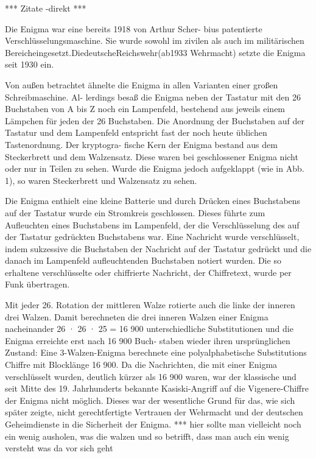 *** Zitate -direkt ***

Die Enigma war eine bereits 1918 von Arthur Scher- bius patentierte Verschlüsselungsmaschine. Sie wurde sowohl im zivilen als auch im militärischen Bereicheingesetzt.DiedeutscheReichswehr(ab1933 Wehrmacht) setzte die Enigma seit 1930 ein.

Von außen betrachtet ähnelte die Enigma in allen Varianten einer großen Schreibmaschine. Al- lerdings besaß die Enigma neben der Tastatur mit den 26 Buchstaben von A bis Z noch ein Lampenfeld, bestehend aus jeweils einem Lämpchen für jeden der 26 Buchstaben. Die Anordnung der Buchstaben auf der Tastatur und dem Lampenfeld entspricht fast der noch heute üblichen Tastenordnung. Der kryptogra- fische Kern der Enigma bestand aus dem Steckerbrett und dem Walzensatz. Diese waren bei geschlossener Enigma nicht oder nur in Teilen zu sehen. Wurde die Enigma jedoch aufgeklappt (wie in Abb. 1), so waren Steckerbrett und Walzensatz zu sehen.

Die Enigma enthielt eine kleine Batterie und durch Drücken eines Buchstabens auf der Tastatur wurde ein Stromkreis geschlossen. Dieses führte zum Aufleuchten eines Buchstabens im Lampenfeld, der die Verschlüsselung des auf der Tastatur gedrückten Buchstabens war. Eine Nachricht wurde verschlüsselt, indem sukzessive die Buchstaben der Nachricht auf der Tastatur gedrückt und die danach im Lampenfeld aufleuchtenden Buchstaben notiert wurden. Die so erhaltene verschlüsselte oder chiffrierte Nachricht, der Chiffretext, wurde per Funk übertragen.

Mit jeder 26. Rotation der mittleren Walze rotierte auch die linke der inneren drei Walzen. Damit berechneten die drei inneren Walzen einer Enigma nacheinander 26 · 26 · 25 = 16 900 unterschiedliche Substitutionen und die Enigma erreichte erst nach 16 900 Buch- staben wieder ihren ursprünglichen Zustand: Eine 3-Walzen-Enigma berechnete eine polyalphabetische Substitutions Chiffre mit Blocklänge 16 900. Da die Nachrichten, die mit einer Enigma verschlüsselt wurden, deutlich kürzer als 16 900 waren, war der klassische und seit Mitte des 19. Jahrhunderts bekannte Kasiski-Angriff auf die Vigenere-Chiffre der Enigma nicht möglich. Dieses war der wesentliche Grund für das, wie sich später zeigte, nicht gerechtfertigte Vertrauen der Wehrmacht und der deutschen Geheimdienste in die Sicherheit der Enigma. 
*** hier sollte man vielleicht noch ein wenig ausholen, was die walzen und so betrifft, dass man auch ein wenig versteht was da vor sich geht


